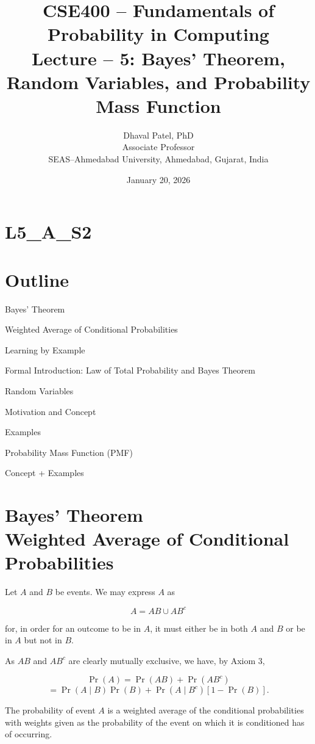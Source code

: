 \documentclass[12pt]{article}
\begin{document}
\title{CSE400 – Fundamentals of Probability in Computing\\
Lecture – 5: Bayes’ Theorem, Random Variables, and Probability Mass Function}
\author{Dhaval Patel, PhD\\
Associate Professor\\
SEAS–Ahmedabad University, Ahmedabad, Gujarat, India}
\date{January 20, 2026}
\maketitle

\section*{L5\_A\_S2}

\section*{Outline}

Bayes’ Theorem

Weighted Average of Conditional Probabilities

Learning by Example

Formal Introduction: Law of Total Probability and Bayes Theorem

Random Variables

Motivation and Concept

Examples

Probability Mass Function (PMF)

Concept + Examples

\section*{Bayes’ Theorem\\Weighted Average of Conditional Probabilities}

Let $A$ and $B$ be events. We may express $A$ as

\[
A = AB \cup AB^c
\]

for, in order for an outcome to be in $A$, it must either be in both $A$ and $B$ or be in $A$ but not in $B$.

As $AB$ and $AB^c$ are clearly mutually exclusive, we have, by Axiom 3,

\[
\Pr(A) = \Pr(AB) + \Pr(AB^c)
\]
\[
= \Pr(A \mid B)\Pr(B) + \Pr(A \mid B^c)[1 - \Pr(B)].
\]

The probability of event $A$ is a weighted average of the conditional probabilities with weights given as the probability of the event on which it is conditioned has of occurring.
\end{document}
